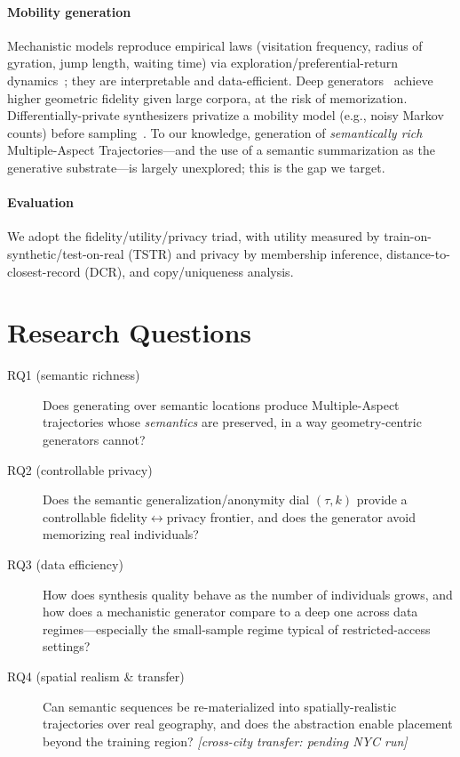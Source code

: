 \documentclass[sigconf,nonacm]{acmart}
\begin{document}
\paragraph{Mobility generation}
Mechanistic models reproduce empirical laws (visitation frequency, radius of gyration, jump length,
waiting time) via exploration/preferential-return dynamics~\cite{song2010,pappalardo2018}; they are
interpretable and data-efficient. Deep generators~\cite{feng2020,rao2020,zhu2023} achieve higher
geometric fidelity given large corpora, at the risk of memorization. Differentially-private
synthesizers privatize a mobility model (e.g., noisy Markov counts) before sampling~\cite{gursoy2018}.
To our knowledge, generation of \emph{semantically rich} Multiple-Aspect Trajectories---and the use of
a semantic summarization as the generative substrate---is largely unexplored; this is the gap we
target.

\paragraph{Evaluation}
We adopt the fidelity/utility/privacy triad, with utility measured by train-on-synthetic/test-on-real
(TSTR) and privacy by membership inference, distance-to-closest-record (DCR), and copy/uniqueness
analysis.

\section{Research Questions}
\begin{description}
  \item[RQ1 (semantic richness)] Does generating over semantic locations produce Multiple-Aspect
  trajectories whose \emph{semantics} are preserved, in a way geometry-centric generators cannot?
  \item[RQ2 (controllable privacy)] Does the semantic generalization/anonymity dial $(\tau,k)$ provide
  a controllable fidelity$\leftrightarrow$privacy frontier, and does the generator avoid memorizing
  real individuals?
  \item[RQ3 (data efficiency)] How does synthesis quality behave as the number of individuals grows,
  and how does a mechanistic generator compare to a deep one across data regimes---especially the
  small-sample regime typical of restricted-access settings?
  \item[RQ4 (spatial realism \& transfer)] Can semantic sequences be re-materialized into
  spatially-realistic trajectories over real geography, and does the abstraction enable placement
  beyond the training region? \textit{[cross-city transfer: pending NYC run]}
\end{description}
\end{document}
